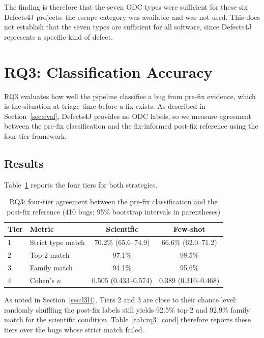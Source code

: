 \documentclass{iutbscthesis}
\begin{document}
The finding is therefore that the seven ODC types were sufficient for these six Defects4J projects: the escape category was available and was not used. This does not establish that the seven types are sufficient for all software, since Defects4J represents a specific kind of defect.

\section{RQ3: Classification Accuracy}
\label{sec:rq3}

RQ3 evaluates how well the pipeline classifies a bug from pre-fix evidence, which is the situation at triage time before a fix exists. As described in Section~\ref{sec:eval}, Defects4J provides no ODC labels, so we measure agreement between the pre-fix classification and the fix-informed post-fix reference using the four-tier framework.

\subsection{Results}

Table~\ref{tab:rq3_levels} reports the four tiers for both strategies.

\begin{table}[!htbp]
    \centering
    \begin{tabular}{l l c c}
        \toprule
        \textbf{Tier} & \textbf{Metric} & \textbf{Scientific} & \textbf{Few-shot} \\
        \midrule
        1 & Strict type match          & 70.2\% (65.6--74.9) & 66.6\% (62.0--71.2) \\
        2 & Top-2 match                & 97.1\% & 98.5\% \\
        3 & Family match               & 94.1\% & 95.6\% \\
        4 & Cohen's $\kappa$           & 0.505 (0.433--0.574) & 0.389 (0.310--0.468) \\
        \bottomrule
    \end{tabular}
    \caption{RQ3: four-tier agreement between the pre-fix classification and the post-fix reference (410 bugs; 95\% bootstrap intervals in parentheses)}
    \label{tab:rq3_levels}
\end{table}

As noted in Section~\ref{sec:l3l4}, Tiers 2 and 3 are close to their chance level: randomly shuffling the post-fix labels still yields 92.5\% top-2 and 92.9\% family match for the scientific condition. Table~\ref{tab:rq3_cond} therefore reports these tiers over the bugs whose strict match failed.
\end{document}
